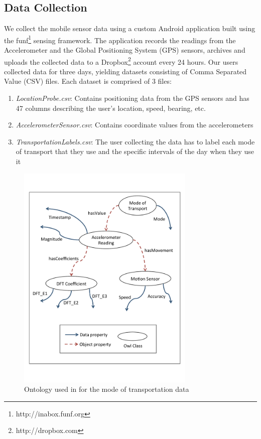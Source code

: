 \subsection{Data Collection}
We collect the mobile sensor data using a custom Android application built using the funf\footnote{http://inabox.funf.org} sensing framework. The application records the readings from the Accelerometer and the Global Positioning System (GPS) sensors, archives and uploads the collected data to a Dropbox\footnote{http://dropbox.com} account every 24 hours. Our users collected data for three days, yielding datasets consisting of Comma Separated Value (CSV) files. Each dataset is comprised of 3 files:
\begin{enumerate}
  \item \textit{LocationProbe.csv}: Contains positioning data from the GPS sensors and has 47 columns describing the user's location, speed, bearing, etc.
  \item \textit{AccelerometerSensor.csv}: Contains coordinate values from the accelerometers
  \item \textit{TransportationLabels.csv}: The user collecting the data has to label each mode of transport that they use and the specific intervals of the day when they use it
\end{enumerate} 
\begin{figure}[h]
\centering
\includegraphics[width=85mm]{img/ontology.pdf}
\caption{Ontology used in for the mode of transportation data\label{fig:ontology}}
\end{figure}

